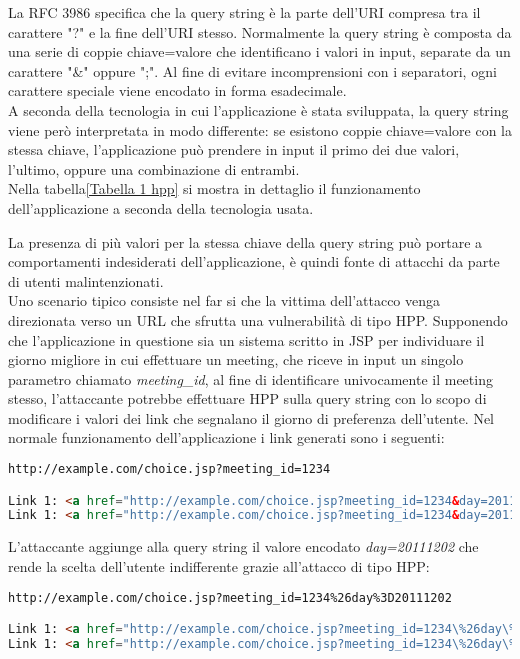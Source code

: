 La RFC 3986\cite{8 su hpp} specifica che la query string è la parte dell'URI compresa tra il carattere "?" e la fine dell'URI stesso. Normalmente la query string è composta da una serie di coppie chiave=valore che identificano i valori in input, separate da un carattere "\&" oppure ";". Al fine di evitare incomprensioni con i separatori, ogni carattere speciale viene encodato in forma esadecimale.	\\
A seconda della tecnologia in cui l'applicazione è stata sviluppata, la query string viene però interpretata in modo differente: se esistono coppie chiave=valore con la stessa chiave, l'applicazione può prendere in input il primo dei due valori, l'ultimo, oppure una combinazione di entrambi.\\
Nella tabella\ref{Tabella 1 hpp} si mostra in dettaglio il funzionamento dell'applicazione a seconda della tecnologia usata.

La presenza di più valori per la stessa chiave della query string può portare a comportamenti indesiderati dell'applicazione, è quindi fonte di attacchi da parte di utenti malintenzionati.\\
Uno scenario tipico consiste nel far si che la vittima dell'attacco venga direzionata verso un URL che sfrutta una vulnerabilità di tipo HPP. Supponendo che l'applicazione in questione sia un sistema scritto in JSP per individuare il giorno migliore in cui effettuare un meeting, che riceve in input un singolo parametro chiamato \emph{meeting\_id}, al fine di identificare univocamente il meeting stesso, l'attaccante potrebbe effettuare HPP sulla query string con lo scopo di modificare i valori dei link che segnalano il giorno di preferenza dell'utente.
Nel normale funzionamento dell'applicazione i link generati sono i seguenti:

\begin{lstlisting}[language=HTML]
http://example.com/choice.jsp?meeting_id=1234

Link 1: <a href="http://example.com/choice.jsp?meeting_id=1234&day=20111201">1 dicembre 2011</a>
Link 1: <a href="http://example.com/choice.jsp?meeting_id=1234&day=20111202">2 dicembre 2011</a>
\end{lstlisting}

L'attaccante aggiunge alla query string il valore encodato \emph{day=20111202} che rende la scelta dell'utente indifferente grazie all'attacco di tipo HPP:

\begin{lstlisting}[language=HTML]
http://example.com/choice.jsp?meeting_id=1234%26day%3D20111202

Link 1: <a href="http://example.com/choice.jsp?meeting_id=1234\%26day\%3D20111202&day=20111201">1 dicembre 2011</a>
Link 1: <a href="http://example.com/choice.jsp?meeting_id=1234\%26day\%3D20111202&day=20111202">2 dicembre 2011</a>
\end{lstlisting}

